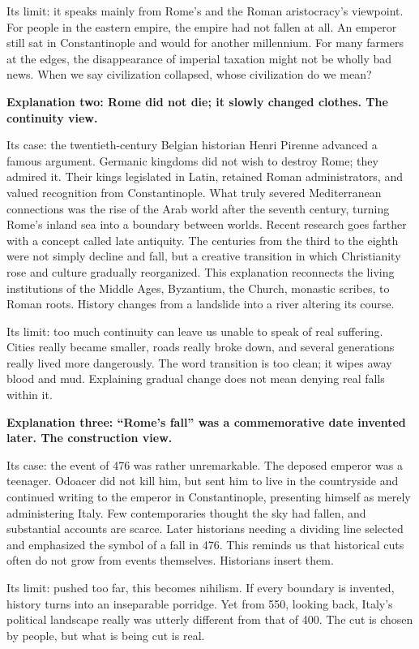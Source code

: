 Its limit: it speaks mainly from Rome's and the Roman aristocracy's viewpoint. For people in the eastern empire, the empire had not fallen at all. An emperor still sat in Constantinople and would for another millennium. For many farmers at the edges, the disappearance of imperial taxation might not be wholly bad news. When we say civilization collapsed, whose civilization do we mean?

\textbf{Explanation two: Rome did not die; it slowly changed clothes. The continuity view.}

Its case: the twentieth-century Belgian historian Henri Pirenne advanced a famous argument. Germanic kingdoms did not wish to destroy Rome; they admired it. Their kings legislated in Latin, retained Roman administrators, and valued recognition from Constantinople. What truly severed Mediterranean connections was the rise of the Arab world after the seventh century, turning Rome's inland sea into a boundary between worlds. Recent research goes farther with a concept called late antiquity. The centuries from the third to the eighth were not simply decline and fall, but a creative transition in which Christianity rose and culture gradually reorganized. This explanation reconnects the living institutions of the Middle Ages, Byzantium, the Church, monastic scribes, to Roman roots. History changes from a landslide into a river altering its course.

Its limit: too much continuity can leave us unable to speak of real suffering. Cities really became smaller, roads really broke down, and several generations really lived more dangerously. The word transition is too clean; it wipes away blood and mud. Explaining gradual change does not mean denying real falls within it.

\textbf{Explanation three: ``Rome's fall'' was a commemorative date invented later. The construction view.}

Its case: the event of 476 was rather unremarkable. The deposed emperor was a teenager. Odoacer did not kill him, but sent him to live in the countryside and continued writing to the emperor in Constantinople, presenting himself as merely administering Italy. Few contemporaries thought the sky had fallen, and substantial accounts are scarce. Later historians needing a dividing line selected and emphasized the symbol of a fall in 476. This reminds us that historical cuts often do not grow from events themselves. Historians insert them.

Its limit: pushed too far, this becomes nihilism. If every boundary is invented, history turns into an inseparable porridge. Yet from 550, looking back, Italy's political landscape really was utterly different from that of 400. The cut is chosen by people, but what is being cut is real.

